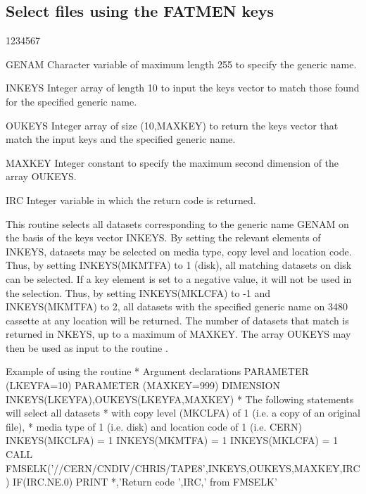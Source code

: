 \subsection{Select files using the FATMEN keys}
\begin{DLtt}{1234567}
\item[GENAM]
Character variable of maximum length 255 to specify the generic name.
\item[INKEYS]
Integer array of length 10 to input the keys vector to match those
found for the specified generic name.
\item[OUKEYS ]
Integer array of size (10,MAXKEY) to return
the keys vector that match the input keys and
the specified generic name.
\item[MAXKEY]
Integer constant to specify the maximum second dimension of
the array OUKEYS.
\item[IRC]
Integer variable in which the return code is returned.
\end{DLtt}
\par
This routine selects all datasets corresponding to the generic
name GENAM on the basis of the keys vector INKEYS. By setting
the relevant elements of INKEYS, datasets may be selected on
media type, copy level and location code. Thus, by setting
INKEYS(MKMTFA) to 1 (disk), all matching datasets on disk can
be selected. If a key element is set to a negative value, it
will not be used in the selection. Thus, by setting INKEYS(MKLCFA) to -1
and INKEYS(MKMTFA) to 2, all datasets with the specified generic name
on 3480 cassette at any location will be returned.
The number of datasets that match is returned in NKEYS, up to a maximum
of MAXKEY. The array OUKEYS may then be used as input to
the routine .
\begin{XMPt}{Example of using the \protect{} routine}
*     Argument declarations
      PARAMETER (LKEYFA=10)
      PARAMETER (MAXKEY=999)
      DIMENSION INKEYS(LKEYFA),OUKEYS(LKEYFA,MAXKEY)
*     The following statements will select all datasets
*     with copy level (MKCLFA) of 1 (i.e. a copy of an original file),
*     media type of 1 (i.e. disk) and location code of 1 (i.e. CERN)
      INKEYS(MKCLFA) = 1
      INKEYS(MKMTFA) = 1
      INKEYS(MKLCFA) = 1
      CALL FMSELK('//CERN/CNDIV/CHRIS/TAPE8',INKEYS,OUKEYS,MAXKEY,IRC)
      IF(IRC.NE.0) PRINT *,'Return code ',IRC,' from FMSELK'
\end{XMPt}
